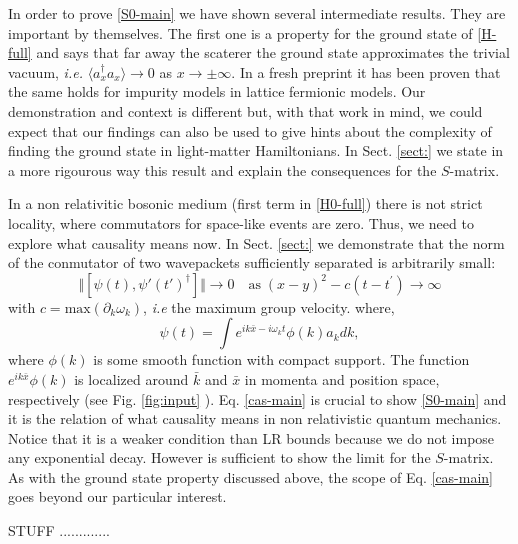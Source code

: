 \documentclass[notitlepage, prx, preprint, amsmath,superscriptaddress,amssymb]{revtex4-1}
\begin{document}
In order to prove \eqref{S0-main}   we have shown several  intermediate results.
They are important by themselves.    The first one is a property for the ground state of \eqref{H-full} and says that far away the scaterer the ground state  approximates the trivial vacuum, \emph{i.e.}  $\langle a_x^\dagger a_x \rangle \to 0$ as $x \to \pm \infty$.  
In a fresh preprint it has been proven that the same holds for impurity models in lattice fermionic models.  Our demonstration and context is  different but, with that work in mind, we could expect that our findings can also be used to give hints about the complexity of finding the ground state in light-matter Hamiltonians.  In Sect. \ref{sect:} we state in a more rigourous way this result and explain the consequences for the $S$-matrix.


In  a non relativitic bosonic medium (first term in \eqref{H0-full}) there is not strict locality, where commutators for space-like events are zero.  Thus, we need to explore what causality means now. In Sect. \ref{sect:}   we demonstrate that the norm of the  conmutator of two wavepackets sufficiently separated  is arbitrarily small:
\begin{equation}
\label{cas-main}
\Vert[\psi(t),\psi'(t')^\dagger]\Vert \to 0  \quad
\text{as} \;  (x-y)^2 -c (t-t^\prime) \to \infty
\end{equation}
with $c= \text {max} ( \partial_k \omega_k )$, \emph{i.e} the maximum group velocity.  where,
\begin{equation}
\label{wp}
\psi(t) = \int  e^{ik\bar x-i\omega_kt} \phi(k) a_k dk,
\end{equation}
where $\phi(k)$ is some smooth function with compact support. The function $e^{ik\bar x} \phi(k)$ is localized around $\bar k$ and $\bar x$ in momenta and position space, respectively  (see Fig. \ref{fig:input} ).
Eq. \eqref{cas-main} is crucial to show \eqref{S0-main} and it is the relation of what causality means in non relativistic quantum mechanics.  Notice that it is a weaker condition than LR bounds because we do not impose any exponential decay.  However is sufficient to show the limit for the $S$-matrix.  As with the ground state property discussed above,  the scope of  Eq. \eqref{cas-main} goes beyond  our particular interest.




 STUFF .............
\end{document}
